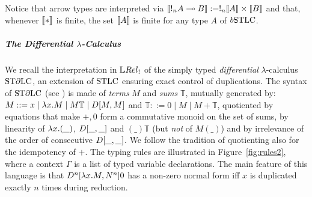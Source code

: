 Notice that arrow types are interpreted via $\llbracket!_{n}A\multimap B\rrbracket:= !_{n}\llbracket A\rrbracket \times \llbracket B\rrbracket$ and that, whenever $\llbracket*\rrbracket$ is finite, the set $\llbracket A\rrbracket$ is finite for any type $A$ of $\BSTLC$.


\subparagraph*{The Differential $\lambda$-Calculus}\label{sec:STDLC}

We recall the interpretation in $\LREL_{!}$ of the simply typed \emph{differential} $\lambda$-calculus $\mathrm{ST}\partial\mathrm{LC}$,  
 an extension of $\mathrm{STLC}$ ensuring exact control of duplications. The syntax of $\mathrm{ST}\partial\mathrm{LC}$ (see \cite[Section 3]{Manzo2010}) is made of \emph{terms} $M$ and \emph{sums} $\mathbb T$, mutually generated by: $M::= x\mid \lambda x.M \mid M\mathbb T \mid \Diff{M}{M}$ and $\mathbb T::= 0 \mid M \mid M+\mathbb T$,
quotiented by equations that make $+,0$ form a commutative monoid on the set of sums, %
by linearity of $\lambda x.(\_)$, $\Diff{\_}{\_}$ and $(\_)\mathbb T$ (but \emph{not} of $M(\_)$) and by irrelevance of the order of consecutive $\Diff{\_}{\_}$.
We follow the tradition of quotienting also for the idempotency of $+$.
The typing rules are illustrated in Figure~\ref{fig:rules2}, where a context $\Gamma$ is a list of typed variable declarations.
The main feature of this language is that $\Der^n[\lambda x.M,N^n]0$ has a non-zero normal form iff $x$ is duplicated exactly $n$ times during reduction.

